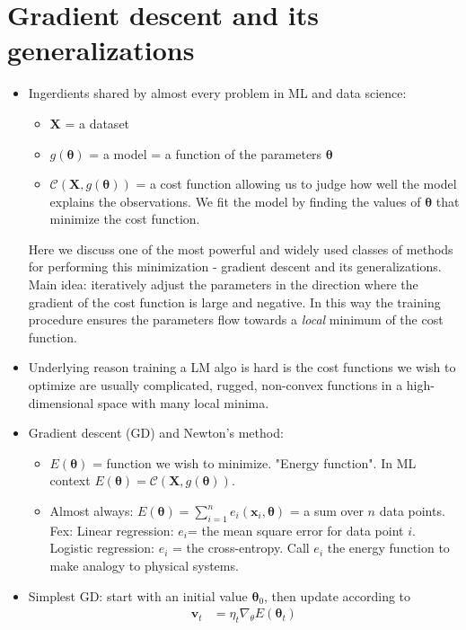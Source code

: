 \documentclass[norsk,a4paper,11pt]{article}
\begin{document}
\section{Gradient descent and its generalizations}
	\begin{itemize}
		\item Ingerdients shared by almost every problem in ML and data science:
		\begin{itemize}
			\item $\mathbf{X}$ = a dataset
			\item $g(\bm{\theta})$ = a model = a function of the parameters $\bm{\theta}$
			\item $\mathcal{C}(\mathbf{X}, g(\bm{\theta}))$ = a cost function allowing us to judge how well the model explains the observations. We fit the model by finding the values of $\bm{\theta}$ that minimize the cost function.
		\end{itemize}
		Here we discuss one of the most powerful and widely used classes of methods for performing this minimization - gradient descent and its generalizations. Main idea: iteratively adjust the parameters in the direction where the gradient of the cost function is large and negative. In this way the training procedure ensures the parameters flow towards a \textit{local} minimum of the cost function.
		\item Underlying reason training a LM algo is hard is the cost functions we wish to optimize are usually complicated, rugged, non-convex functions in a high-dimensional space with many local minima.
		\item Gradient descent (GD) and Newton's method:
		\begin{itemize}
			\item $E(\bm{\theta})$ = function we wish to minimize. "Energy function". In ML context $E(\bm{\theta}) = \mathcal{C}(\mathbf{X}, g(\bm{\theta}))$.
			\item Almost always: $E(\bm{\theta}) = \sum_{i=1}^n e_i(\mathbf{x}_i, \bm{\theta})$ = a sum over $n$ data points. Fex: Linear regression: $e_i$= the mean square error for data point $i$. Logistic regression: $e_i$ = the cross-entropy. Call $e_i$ the energy function to make analogy to physical systems.
		\end{itemize}
		\item Simplest GD: start with an initial value $\bm{\theta}_0$, then update according to
		\begin{align}
			\mathbf{v}_t &= \eta_t \nabla_\theta E(\bm{\theta}_t) \\

\end{align}
\end{itemize}
\end{document}

